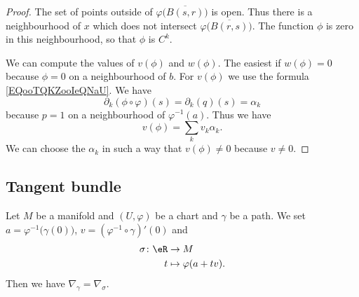 \begin{proof}
    The set of points outside of \( \varphi\big( \overline{ B(s,r) } \big)\) is open. Thus there is a neighbourhood of \( x\) which does not intersect \( \varphi\big( \overline{ B(r,s) } \big)\). The function \( \phi\) is zero in this neighbourhood, so that \( \phi\) is \(  C^k\).

    We can compute the values of \( v(\phi)\) and \( w(\phi)\). The easiest if \( w(\phi)=0\) because \( \phi=0\) on a neighbourhood of \( b\). For \( v(\phi)\) we use the formula \ref{EQooTQKZooIeQNaU}. We have
    \begin{equation}
        \partial_k(\phi\circ\varphi)(s)=\partial_k(q)(s)=\alpha_k
    \end{equation}
    because \( p=1\) on a neighbourhood of \( \varphi^{-1}(a)\). Thus we have
    \begin{equation}
        v(\phi)=\sum_kv_k\alpha_k.
    \end{equation}
    We can choose the \( \alpha_k\) in such a way that \( v(\phi)\neq 0\) because \( v\neq 0\).
\end{proof}

\subsection{Tangent bundle}


\begin{lemma}       \label{LEMooXFNQooXwCMNB}
    Let \( M\) be a manifold and \( (U,\varphi)\) be a chart and \( \gamma\) be a path. We set \( a=\varphi^{-1}\big( \gamma(0) \big)\), \(v= (\varphi^{-1}\circ\gamma)'(0)\) and
    \begin{equation}
        \begin{aligned}
            \sigma\colon \eR&\to M \\
            t&\mapsto \varphi(a+tv). 
        \end{aligned}
    \end{equation}
    Then we have \( \nabla_{\gamma}=\nabla_{\sigma}\).   
\end{lemma}

